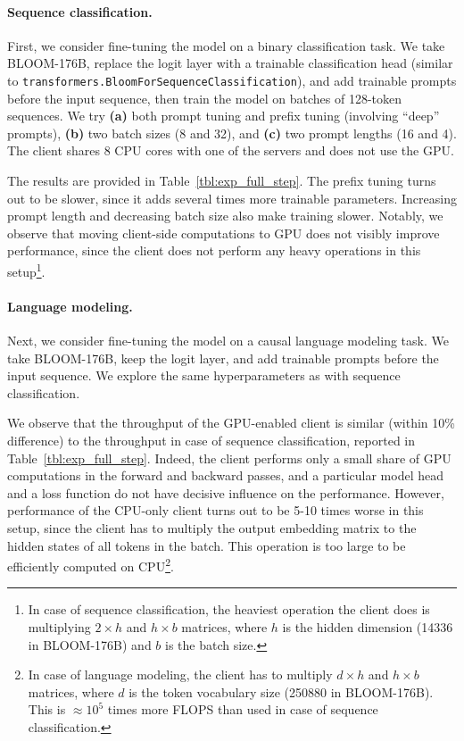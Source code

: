 \paragraph{Sequence classification.} First, we consider fine-tuning the model on a binary classification task. We take BLOOM-176B, replace the logit layer with a trainable classification head (similar to \texttt{transformers.BloomForSequenceClassification}), and add trainable prompts before the input sequence, then train the model on batches of 128-token sequences. We try \textbf{(a)} both prompt tuning and prefix tuning (involving ``deep'' prompts), \textbf{(b)} two batch sizes (8 and 32), and \textbf{(c)} two prompt lengths (16 and 4). The client shares 8 CPU cores with one of the servers and does not use the GPU.

The results are provided in Table~\ref{tbl:exp_full_step}. The prefix tuning turns out to be slower, since it adds several times more trainable parameters. Increasing prompt length and decreasing batch size also make training slower. Notably, we observe that moving client-side computations to GPU does not visibly improve performance, since the client does not perform any heavy operations in this setup\footnote{In case of sequence classification, the heaviest operation the client does is multiplying $2 \times h$ and $h \times b$ matrices, where $h$ is the hidden dimension (14336 in BLOOM-176B) and $b$ is the batch size.}.

\paragraph{Language modeling.} Next, we consider fine-tuning the model on a causal language modeling task. We take BLOOM-176B, keep the logit layer, and add trainable prompts before the input sequence. We explore the same hyperparameters as with sequence classification.

We observe that the throughput of the GPU-enabled client is similar (within 10\% difference) to the throughput in case of sequence classification, reported in Table~\ref{tbl:exp_full_step}. Indeed, the client performs only a small share of GPU computations in the forward and backward passes, and a particular model head and a loss function do not have decisive influence on the performance. However, performance of the CPU-only client turns out to be 5-10 times worse in this setup, since the client has to multiply the output embedding matrix to the hidden states of all tokens in the batch. This operation is too large to be efficiently computed on CPU\footnote{In case of language modeling, the client has to multiply $d \times h$ and $h \times b$ matrices, where $d$ is the token vocabulary size (250880 in BLOOM-176B). This is $\approx 10^5$ times more FLOPS than used in case of sequence classification.}.

